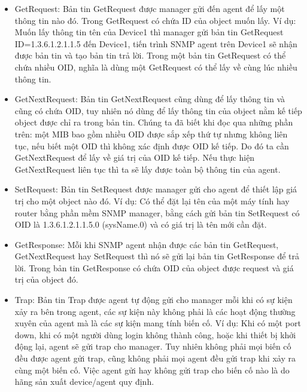 \documentclass[12pt,oneside,a4paper,reqno]{report}
\begin{document}
\begin{large}
\begin{itemize}

\item GetRequest: Bản tin GetRequest được manager gửi đến agent để lấy một thông tin nào đó. Trong GetRequest có chứa ID của object muốn lấy. Ví dụ: Muốn lấy thông tin tên của Device1 thì manager gửi bản tin GetRequest ID=1.3.6.1.2.1.1.5 đến Device1, tiến trình SNMP agent trên Device1 sẽ nhận được bản tin và tạo bản tin trả lời. Trong một bản tin GetRequest có thể chứa nhiều OID, nghĩa là dùng một GetRequest có thể lấy về cùng lúc nhiều thông tin.

\item GetNextRequest: Bản tin GetNextRequest cũng dùng để lấy thông tin và cũng có chứa OID, tuy nhiên nó dùng để lấy thông tin của object nằm kế tiếp object được chỉ ra trong bản tin. Chúng ta đã biết khi đọc qua những phần trên: một MIB bao gồm nhiều OID được sắp xếp thứ tự nhưng không liên tục, nếu biết một OID thì không xác định được OID kế tiếp. Do đó ta cần GetNextRequest để lấy về giá trị của OID kế tiếp. Nếu thực hiện GetNextRequest liên tục thì ta sẽ lấy được toàn bộ thông tin của agent.

\item SetRequest: Bản tin SetRequest được manager gửi cho agent để thiết lập giá trị cho một object nào đó. Ví dụ: Có thể đặt lại tên của một máy tính hay router bằng phần mềm SNMP manager, bằng cách gửi bản tin SetRequest có OID là 1.3.6.1.2.1.1.5.0 (sysName.0) và có giá trị là tên mới cần đặt.

\item GetResponse: Mỗi khi SNMP agent nhận được các bản tin GetRequest, GetNextRequest hay SetRequest thì nó sẽ gửi lại bản tin GetResponse để trả lời. Trong bản tin GetResponse có chứa OID của object được request và giá trị của object đó. 

\item Trap: Bản tin Trap được agent tự động gửi cho manager mỗi khi có sự kiện xảy ra bên trong agent, các sự kiện này không phải là các hoạt động thường xuyên của agent mà là các sự kiện mang tính biến cố. Ví dụ: Khi có một port down, khi có một người dùng login không thành công, hoặc khi thiết bị khởi động lại, agent sẽ gửi trap cho manager. Tuy nhiên không phải mọi biến cố đều được agent gửi trap, cũng không phải mọi agent đều gửi trap khi xảy ra cùng một biến cố. Việc agent gửi hay không gửi trap cho biến cố nào là do hãng sản xuất device/agent quy định.
\end{itemize}


\end{large}
\end{document}
